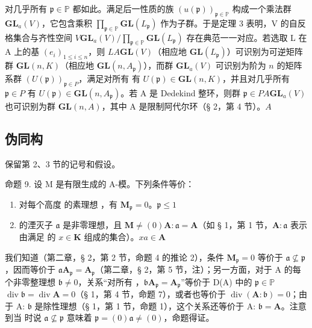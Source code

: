 对几乎所有 \(\mathfrak{p} \in \mathbb{P}\) 都如此。满足后一性质的族 \((u(\mathfrak{p}))_{\mathfrak{p} \in \mathbb{P}}\) 构成一个乘法群 \(\mathbf{GL}_a(V)\)，它包含乘积 \(\prod_{\mathfrak{p} \in \mathbb{P}} \mathbf{GL}(L_{\mathfrak{p}})\) 作为子群。于是定理 3 表明，V 的自反格集合与齐性空间 \(V\)\(\mathbf{GL}_a(V)/\prod_{\mathfrak{p} \in \mathbb{P}} \mathbf{GL}(L_{\mathfrak{p}})\) 存在典范一一对应。若选取 L 在 A 上的基 \((e_i)_{1 \leq i \leq n}\)，则 \(L\)\(A\)\(\mathbf{GL}(V)\)（相应地 \(\mathbf{GL}(L_{\mathfrak{p}})\)）可识别为可逆矩阵群 \(\mathbf{GL}(n, K)\)（相应地 \(\mathbf{GL}(n, A_{\mathfrak{p}})\)），而群 \(\mathbf{GL}_a(V)\) 可识别为阶为 \(n\) 的矩阵系群 \((U(\mathfrak{p}))_{\mathfrak{p} \in P}\)，满足对所有  有 \(U(\mathfrak{p}) \in \mathbf{GL}(n, K)\)，并且对几乎所有 \(\mathfrak{p} \in P\) 有 \(U(\mathfrak{p}) \in \mathbf{GL}(n, A_{\mathfrak{p}})\)。若 A 是 Dedekind 整环，则群 \(\mathfrak{p} \in P\)\(A\)\(\mathbf{GL}_a(V)\) 也可识别为群 \(\mathbf{GL}(n, A)\)，其中 A 是限制阿代尔环（§ 2，第 4 节）。\(A\)

\subsection{伪同构}

保留第 2、3 节的记号和假设。

命题 9. 设 M 是有限生成的 A-模。下列条件等价：

\begin{enumerate}
\def\labelenumi{(\alph{enumi})}
\item
  对每个高度  的素理想 ，有 \(\mathbf{M}_{\mathfrak{p}} = 0\)。\(\mathfrak{p}\)\(\leqslant 1\)
\item
   的湮灭子 \(\mathfrak{a}\) 是非零理想，且 \(\mathbf{M}\)\(\neq (0)\)\(\mathbf{A}:\mathfrak{a} = \mathbf{A}\)（如 § 1，第 1 节，\(\mathbf{A}:\mathfrak{a}\) 表示由满足  的 \(x\in \mathbf{K}\) 组成的集合）。\(xa\in \mathbf{A}\)
\end{enumerate}

我们知道（第二章，§ 2，第 2 节，命题 4 的推论 2），条件 \(\mathbf{M}_{\mathfrak{p}} = 0\) 等价于 \(\mathfrak{a} \nsubseteq \mathfrak{p}\)，因而等价于 \(\mathfrak{a}\mathbf{A}_{\mathfrak{p}} = \mathbf{A}_{\mathfrak{p}}\)（第二章，§ 2，第 5 节，注）；另一方面，对于 A 的每个非零整理想 \(\mathfrak{b} \neq 0\)，关系``对所有 ，\(\mathfrak{b}\mathbf{A}_{\mathfrak{p}} = \mathbf{A}_{\mathfrak{p}}\)''等价于 D(A) 中的 \(\mathfrak{p} \in \mathbb{P}\)\(\operatorname{div} \mathfrak{b} = \operatorname{div} \mathbf{A} = 0\)（§ 1，第 4 节，命题 7），或者也等价于 \(\operatorname{div}(\mathbf{A}: \mathfrak{b}) = 0\)；由于 A: \(\mathfrak{b}\) 是除性理想（§ 1，第 1 节，命题 1），这个关系还等价于 A: \(\mathfrak{b} = \mathbf{A}\)。注意到当  时说 \(\mathfrak{a} \nsubseteq \mathfrak{p}\) 意味着 \(\mathfrak{p} = (0)\)\(\mathfrak{a} \neq (0)\)，命题得证。


